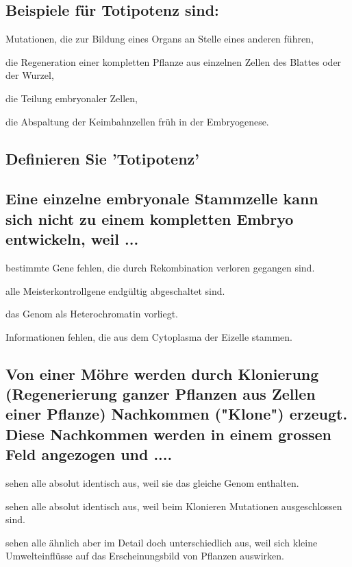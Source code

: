 \documentclass{article}
\begin{document}
\subsection*{Beispiele für Totipotenz sind:}
\begin{todolist}%
\item Mutationen, die zur Bildung eines Organs an Stelle eines anderen führen,  
\item die Regeneration einer kompletten Pflanze aus einzelnen Zellen des
Blattes oder der Wurzel,  
\item die Teilung embryonaler Zellen,  
\item die Abspaltung der Keimbahnzellen früh in der Embryogenese.  
\end{todolist}
\subsection*{Definieren Sie 'Totipotenz'}
\bigskip\bigskip\bigskip\bigskip\bigskip\bigskip


\subsection*{Eine einzelne embryonale Stammzelle kann sich nicht zu einem
kompletten Embryo entwickeln, weil ...}
\begin{todolist}%
\item bestimmte Gene fehlen, die durch Rekombination verloren gegangen
sind.  
\item alle Meisterkontrollgene endgültig abgeschaltet sind.   
\item das Genom als Heterochromatin vorliegt.  
\item Informationen fehlen, die aus dem Cytoplasma der Eizelle stammen.    
\end{todolist}

\subsection*{Von einer Möhre werden durch Klonierung (Regenerierung ganzer
Pflanzen aus Zellen einer Pflanze) Nachkommen ("Klone") erzeugt.
Diese Nachkommen werden in einem grossen Feld angezogen und
....}
\begin{todolist}%
\item sehen alle absolut identisch aus, weil sie das gleiche Genom
enthalten.  
\item sehen alle absolut identisch aus, weil beim Klonieren Mutationen
ausgeschlossen sind.
\item sehen alle ähnlich aber im Detail doch unterschiedlich aus, weil sich
kleine Umwelteinflüsse auf das Erscheinungsbild von Pflanzen
auswirken.
\end{todolist}
\end{document}
